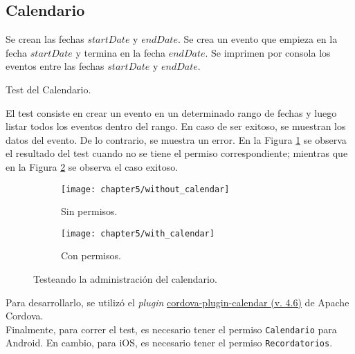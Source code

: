 \subsection{Calendario}
\begin{algorithm}
	\begin{algorithmic}[1]
		\STATE Se crean las fechas $startDate$ y $endDate$.
		\STATE Se crea un evento que empieza en la fecha $startDate$ y termina en la fecha $endDate$.
		\STATE Se imprimen por consola los eventos entre las fechas $startDate$ y $endDate$.
	\end{algorithmic}
	\caption{Test del Calendario.}\label{alg:chap5:test_calendario}
\end{algorithm}
El test consiste en crear un evento en un determinado rango de fechas y luego listar todos los eventos dentro del rango. En caso de ser exitoso, se muestran los datos del evento. De lo contrario, se muestra un error. En la Figura \ref{fig:ch05:without_calendar} se observa el resultado del test cuando no se tiene el permiso correspondiente; mientras que en la Figura \ref{fig:ch05:with_calendar} se observa el caso exitoso.\\
\begin{figure}[hbp]
    \centering
    \begin{subfigure}{0.29\linewidth}
        \texttt{[image: chapter5/without\_calendar]}
        \caption{Sin permisos.}
        \label{fig:ch05:without_calendar}
    \end{subfigure}
    \begin{subfigure}{0.29\linewidth}
        \texttt{[image: chapter5/with\_calendar]}
        \caption{Con permisos.}
        \label{fig:ch05:with_calendar}
    \end{subfigure}
    \caption{Testeando la administración del calendario.}
	\label{fig:ch05:calendar-cases}
\end{figure}

Para desarrollarlo, se utilizó el \textit{plugin} \href{https://www.npmjs.com/package/cordova-plugin-calendar}{cordova-plugin-calendar (v. 4.6)} de Apache Cordova.\\

Finalmente, para correr el test, es necesario tener el permiso \texttt{Calendario} para Android. En cambio, para iOS, es necesario tener el permiso \texttt{Recordatorios}.
